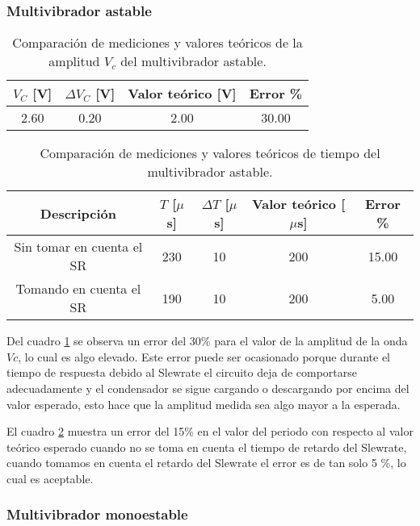 \subsubsection{Multivibrador astable}

\begin{table}[ht]
\centering
\begin{tabular}{|c|c|c|c|}
\hline
\(V_C\) [V] & \(\Delta V_C\) [V] & Valor teórico [V] & Error \% \\ \hline
2.60 & 0.20 & 2.00 & 30.00 \\ \hline
\end{tabular}
\caption{Comparación de mediciones y valores teóricos de la amplitud $V_c$ del multivibrador astable.}
\label{tab:comparacion-multivibrador-astable-amplitud}
\end{table}

\begin{table}[ht]
\centering
\begin{tabular}{|c|c|c|c|c|}
\hline
Descripción & \(T\) [\(\mu\)s] & \(\Delta T\) [\(\mu\)s] & Valor teórico [\(\mu\)s] & Error \% \\ \hline
Sin tomar en cuenta el SR &230 & 10 & 200 & 15.00 \\ \hline
Tomando en cuenta el SR & 190 & 10 & 200 & 5.00 \\ \hline
\end{tabular}
\caption{Comparación de mediciones y valores teóricos de tiempo del multivibrador astable.}
\label{tab:comparacion-tiempo-multivibrador-astable}
\end{table}

Del cuadro \ref{tab:comparacion-multivibrador-astable-amplitud} se observa un error del 30\% para el valor de la amplitud de la onda $Vc$, lo cual es algo elevado. Este error puede ser ocasionado porque durante el tiempo de respuesta debido al Slewrate el circuito deja de comportarse adecuadamente y el condensador se sigue cargando o descargando por encima del valor esperado, esto hace que la amplitud medida sea algo mayor a la esperada.

El cuadro \ref{tab:comparacion-tiempo-multivibrador-astable} muestra un error del 15\% en el valor del periodo con respecto al valor teórico esperado cuando no se toma en cuenta el tiempo de retardo del Slewrate, cuando tomamos en cuenta el retardo del Slewrate el error es de tan solo 5 \%, lo cual es aceptable.


\subsubsection{Multivibrador monoestable}

